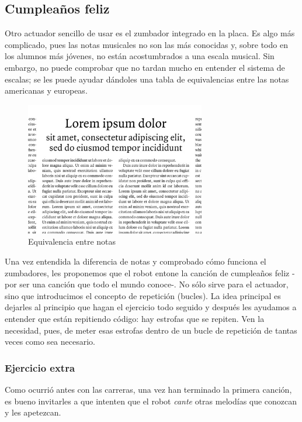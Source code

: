 \subsection{Cumpleaños feliz}
Otro actuador sencillo de usar es el zumbador integrado en la placa. Es algo más complicado, pues las notas musicales no son las más conocidas y, sobre todo en los alumnos más jóvenes, no están acostumbrados a una escala musical. Sin embargo, no puede comprobar que no tardan mucho en entender el sistema de escalas; se les puede ayudar dándoles una tabla de equivalencias entre las notas americanas y europeas. 
\begin{figure}[H]
	\centering
	\includegraphics[width=0.7\textwidth]{img/lorem.jpg}
	\caption{Equivalencia entre notas}	
\end{figure}
Una vez entendida la diferencia de notas y comprobado cómo funciona el zumbadores, les proponemos que el robot entone la canción de cumpleaños feliz -por ser una canción que todo el mundo conoce-. No sólo sirve para el actuador, sino que introducimos el concepto de repetición (bucles). La idea principal es dejarles al principio que hagan el ejercicio todo seguido y después les ayudamos a entender que están repitiendo código: hay estrofas que se repiten. Ven la necesidad, pues, de meter esas estrofas dentro de un bucle de repetición de tantas veces como sea necesario.\\
\subsubsection{Ejercicio extra}
Como ocurrió antes con las carreras, una vez han terminado la primera canción, es bueno invitarles a que intenten que el robot \textit{cante} otras melodías que conozcan y les apetezcan. 
